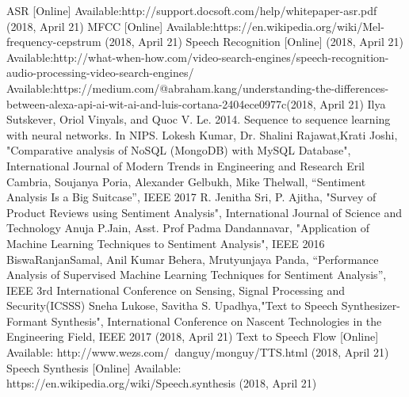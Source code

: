 \documentclass[conference]{IEEEtran}
\begin{document}
\begin{thebibliography}{00}
 ASR [Online] Available:http://support.docsoft.com/help/whitepaper-asr.pdf (2018, April 21)  
   MFCC [Online] Available:https://en.wikipedia.org/wiki/Mel-frequency-cepstrum (2018, April 21) 
   Speech Recognition [Online] (2018, April 21) Available:http://what-when-how.com/video-search-engines/speech-recognition-audio-processing-video-search-engines/
   Available:https://medium.com/@abraham.kang/understanding-the-differences-between-alexa-api-ai-wit-ai-and-luis-cortana-2404ece0977c(2018, April 21)
   Ilya Sutskever, Oriol Vinyals, and Quoc V. Le. 2014.
  Sequence to sequence learning with neural networks. In
  NIPS.
   Lokesh Kumar, Dr. Shalini Rajawat,Krati Joshi, "Comparative analysis of NoSQL (MongoDB) with MySQL Database", International Journal of Modern Trends in Engineering and Research
  Eril Cambria, Soujanya Poria, Alexander Gelbukh, Mike Thelwall, “Sentiment Analysis Is a Big Suitcase”, IEEE 2017
   R. Jenitha Sri, P. Ajitha, "Survey of Product Reviews using Sentiment Analysis", International Journal of Science and Technology
  Anuja P.Jain, Asst. Prof Padma Dandannavar, "Application of Machine Learning Techniques to Sentiment Analysis", IEEE 2016
 BiswaRanjanSamal, Anil Kumar Behera, Mrutyunjaya Panda, “Performance Analysis of Supervised Machine Learning Techniques for Sentiment Analysis”, IEEE 3rd International Conference on Sensing, Signal Processing and Security(ICSSS)
   Sneha Lukose, Savitha S. Upadhya,"Text to Speech Synthesizer-Formant Synthesis", International Conference on Nascent Technologies in the Engineering Field, IEEE 2017 (2018, April 21) 
 Text to Speech Flow [Online] Available: http://www.wezs.com/~danguy/monguy/TTS.html (2018, April 21) 
 Speech Synthesis [Online] Available: https://en.wikipedia.org/wiki/Speech.synthesis (2018, April 21) 
 
 
 \end{thebibliography}
\end{document}
